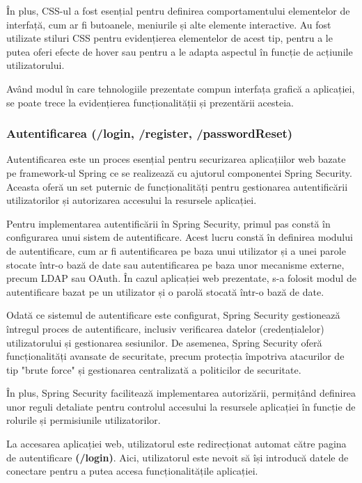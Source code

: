 \documentclass[12pt]{article}
\begin{document}
\^{I}n plus, CSS-ul a fost esențial pentru definirea comportamentului elementelor de interfaț\u{a}, cum ar fi butoanele, meniurile și alte elemente interactive. Au fost utilizate stiluri CSS pentru evidențierea elementelor de acest tip, pentru a le putea oferi efecte de hover sau pentru a le adapta aspectul \^{i}n funcție de acțiunile utilizatorului.

Av\^{a}nd modul \^{i}n care tehnologiile prezentate compun interfața grafic\u{a} a aplicației, se poate trece la evidențierea funcționalit\u{a}ții și prezent\u{a}rii acesteia.

\subsubsection{Autentificarea (/login, /register, /passwordReset)}

Autentificarea este un proces esențial pentru securizarea aplicațiilor web bazate pe framework-ul Spring ce se realizeaz\u{a} cu ajutorul componentei Spring Security. Aceasta ofer\u{a} un set puternic de funcționalit\u{a}ți pentru gestionarea autentific\u{a}rii utilizatorilor și autorizarea accesului la resursele aplicației.

Pentru implementarea autentific\u{a}rii \^{i}n Spring Security, primul pas const\u{a} \^{i}n configurarea unui sistem de autentificare. Acest lucru const\u{a} \^{i}n definirea modului de autentificare, cum ar fi autentificarea pe baza unui utilizator și a unei parole stocate \^{i}ntr-o baz\u{a} de date sau autentificarea pe baza unor mecanisme externe, precum LDAP sau OAuth. \^{I}n cazul aplicației web prezentate, s-a folosit modul de autentificare bazat pe un utilizator și o parol\u{a} stocat\u{a} \^{i}ntr-o baz\u{a} de date.

Odat\u{a} ce sistemul de autentificare este configurat, Spring Security gestioneaz\u{a} \^{i}ntregul proces de autentificare, inclusiv verificarea datelor (credențialelor) utilizatorului și gestionarea sesiunilor. De asemenea, Spring Security ofer\u{a} funcționalit\u{a}ți avansate de securitate, precum protecția \^{i}mpotriva atacurilor de tip "brute force" și gestionarea centralizat\u{a} a politicilor de securitate.

\^{I}n plus, Spring Security faciliteaz\u{a} implementarea autoriz\u{a}rii, permiț\^{a}nd definirea unor reguli detaliate pentru controlul accesului la resursele aplicației \^{i}n funcție de rolurile și permisiunile utilizatorilor.

La accesarea aplicației web, utilizatorul este redirecționat automat c\u{a}tre pagina de autentificare \textbf{(/login)}. Aici, utilizatorul este nevoit s\u{a} \^{i}și introduc\u{a} datele de conectare pentru a putea accesa funcționalit\u{a}țile aplicației. 
\end{document}
